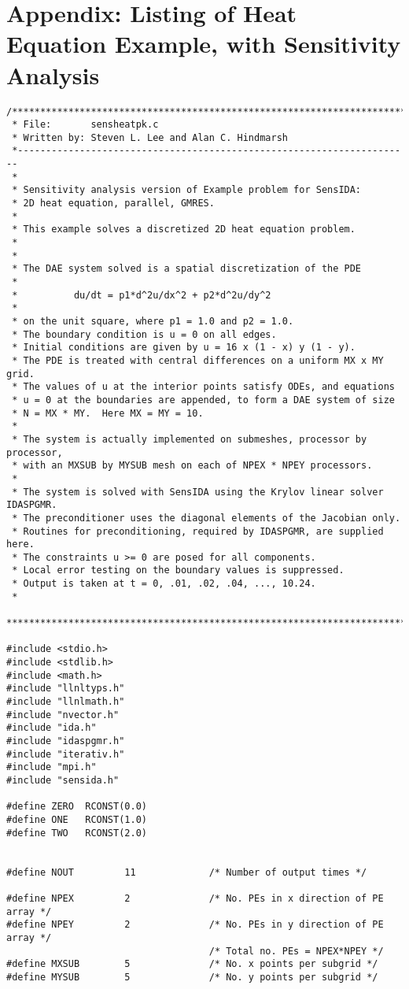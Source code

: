 \section{Appendix: Listing of Heat Equation Example, with Sensitivity
Analysis}
\begin{verbatim}
/***********************************************************************
 * File:       sensheatpk.c   
 * Written by: Steven L. Lee and Alan C. Hindmarsh
 *----------------------------------------------------------------------
 *
 * Sensitivity analysis version of Example problem for SensIDA:
 * 2D heat equation, parallel, GMRES.
 *
 * This example solves a discretized 2D heat equation problem.
 *
 *
 * The DAE system solved is a spatial discretization of the PDE 
 *
 *          du/dt = p1*d^2u/dx^2 + p2*d^2u/dy^2
 *
 * on the unit square, where p1 = 1.0 and p2 = 1.0.  
 * The boundary condition is u = 0 on all edges.
 * Initial conditions are given by u = 16 x (1 - x) y (1 - y).
 * The PDE is treated with central differences on a uniform MX x MY grid.
 * The values of u at the interior points satisfy ODEs, and equations
 * u = 0 at the boundaries are appended, to form a DAE system of size
 * N = MX * MY.  Here MX = MY = 10.
 *
 * The system is actually implemented on submeshes, processor by processor,
 * with an MXSUB by MYSUB mesh on each of NPEX * NPEY processors.
 *
 * The system is solved with SensIDA using the Krylov linear solver IDASPGMR. 
 * The preconditioner uses the diagonal elements of the Jacobian only.
 * Routines for preconditioning, required by IDASPGMR, are supplied here.
 * The constraints u >= 0 are posed for all components.
 * Local error testing on the boundary values is suppressed. 
 * Output is taken at t = 0, .01, .02, .04, ..., 10.24.
 *
 ***********************************************************************/

#include <stdio.h>
#include <stdlib.h>
#include <math.h>
#include "llnltyps.h"
#include "llnlmath.h"
#include "nvector.h"
#include "ida.h"
#include "idaspgmr.h"
#include "iterativ.h"
#include "mpi.h"
#include "sensida.h"

#define ZERO  RCONST(0.0)
#define ONE   RCONST(1.0)
#define TWO   RCONST(2.0)


#define NOUT         11             /* Number of output times */

#define NPEX         2              /* No. PEs in x direction of PE array */
#define NPEY         2              /* No. PEs in y direction of PE array */
                                    /* Total no. PEs = NPEX*NPEY */
#define MXSUB        5              /* No. x points per subgrid */
#define MYSUB        5              /* No. y points per subgrid */


\end{verbatim}
